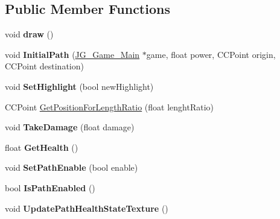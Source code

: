 \subsection*{Public Member Functions}
\begin{DoxyCompactItemize}
\item 
\hypertarget{class_j_g___path_ae65379b3c8c17378afb0f7686b150ce9}{void {\bfseries draw} ()}\label{class_j_g___path_ae65379b3c8c17378afb0f7686b150ce9}

\item 
\hypertarget{class_j_g___path_a92dec43ef96e3d4ef52da5bb51c441b2}{void {\bfseries Initial\-Path} (\hyperlink{class_j_g___game___main}{J\-G\-\_\-\-Game\-\_\-\-Main} $\ast$game, float power, C\-C\-Point origin, C\-C\-Point destination)}\label{class_j_g___path_a92dec43ef96e3d4ef52da5bb51c441b2}

\item 
\hypertarget{class_j_g___path_a3f7ab3440f2ec8f3c36ced84e1f8d5fd}{void {\bfseries Set\-Highlight} (bool new\-Highlight)}\label{class_j_g___path_a3f7ab3440f2ec8f3c36ced84e1f8d5fd}

\item 
C\-C\-Point \hyperlink{class_j_g___path_a456741c5da849a3c85b7637ba62d4bff}{Get\-Position\-For\-Length\-Ratio} (float lenght\-Ratio)
\item 
\hypertarget{class_j_g___path_aabf40621781f21d2e6ee48042bb240b8}{void {\bfseries Take\-Damage} (float damage)}\label{class_j_g___path_aabf40621781f21d2e6ee48042bb240b8}

\item 
\hypertarget{class_j_g___path_adeed588e6bd3099d50ef694eba5b7dba}{float {\bfseries Get\-Health} ()}\label{class_j_g___path_adeed588e6bd3099d50ef694eba5b7dba}

\item 
\hypertarget{class_j_g___path_a9e477159ffc3743715b2cb30bd4c29e9}{void {\bfseries Set\-Path\-Enable} (bool enable)}\label{class_j_g___path_a9e477159ffc3743715b2cb30bd4c29e9}

\item 
\hypertarget{class_j_g___path_a99e1856bb8fb5f1b8c2fc1b3d5688610}{bool {\bfseries Is\-Path\-Enabled} ()}\label{class_j_g___path_a99e1856bb8fb5f1b8c2fc1b3d5688610}

\item 
\hypertarget{class_j_g___path_a7f546937079f74890bfc3a28e60756bb}{void {\bfseries Update\-Path\-Health\-State\-Texture} ()}\label{class_j_g___path_a7f546937079f74890bfc3a28e60756bb}


\end{DoxyCompactItemize}
